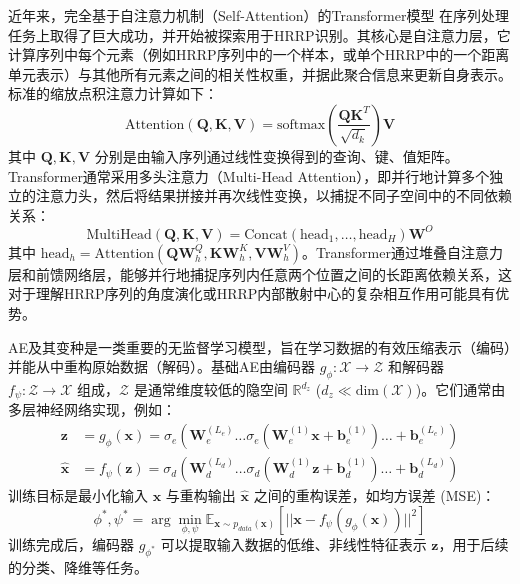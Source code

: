 近年来，完全基于自注意力机制（Self-Attention）的Transformer模型 在序列处理任务上取得了巨大成功，并开始被探索用于HRRP识别。其核心是自注意力层，它计算序列中每个元素（例如HRRP序列中的一个样本，或单个HRRP中的一个距离单元表示）与其他所有元素之间的相关性权重，并据此聚合信息来更新自身表示。标准的缩放点积注意力计算如下：
\begin{equation}
    \text{Attention}(\mathbf{Q}, \mathbf{K}, \mathbf{V}) = \text{softmax}\left(\frac{\mathbf{Q}\mathbf{K}^T}{\sqrt{d_k}}\right)\mathbf{V}
    \label{eq:scaled_dot_product_attention}
\end{equation}
其中 $\mathbf{Q}, \mathbf{K}, \mathbf{V}$ 分别是由输入序列通过线性变换得到的查询、键、值矩阵。Transformer通常采用多头注意力（Multi-Head Attention），即并行地计算多个独立的注意力头，然后将结果拼接并再次线性变换，以捕捉不同子空间中的不同依赖关系：
\begin{equation}
    \text{MultiHead}(\mathbf{Q}, \mathbf{K}, \mathbf{V}) = \text{Concat}(\text{head}_1, \dots, \text{head}_H) \mathbf{W}^O
    \label{eq:multi_head_attention}
\end{equation}
其中 $\text{head}_h = \text{Attention}(\mathbf{Q}\mathbf{W}_h^Q, \mathbf{K}\mathbf{W}_h^K, \mathbf{V}\mathbf{W}_h^V)$。Transformer通过堆叠自注意力层和前馈网络层，能够并行地捕捉序列内任意两个位置之间的长距离依赖关系，这对于理解HRRP序列的角度演化或HRRP内部散射中心的复杂相互作用可能具有优势。

AE及其变种是一类重要的无监督学习模型，旨在学习数据的有效压缩表示（编码）并能从中重构原始数据（解码）。基础AE由编码器 $g_\phi: \mathcal{X} \rightarrow \mathcal{Z}$ 和解码器 $f_\psi: \mathcal{Z} \rightarrow \mathcal{X}$ 组成，$\mathcal{Z}$ 是通常维度较低的隐空间 $\mathbb{R}^{d_z}$ ($d_z \ll \text{dim}(\mathcal{X})$)。它们通常由多层神经网络实现，例如：
\begin{align}
    \mathbf{z} &= g_\phi(\mathbf{x}) = \sigma_e(\mathbf{W}_e^{(L_e)} \dots \sigma_e(\mathbf{W}_e^{(1)} \mathbf{x} + \mathbf{b}_e^{(1)}) \dots + \mathbf{b}_e^{(L_e)}) \label{eq:ae_encoder_mlp} \\
    \hat{\mathbf{x}} &= f_\psi(\mathbf{z}) = \sigma_d(\mathbf{W}_d^{(L_d)} \dots \sigma_d(\mathbf{W}_d^{(1)} \mathbf{z} + \mathbf{b}_d^{(1)}) \dots + \mathbf{b}_d^{(L_d)}) \label{eq:ae_decoder_mlp}
\end{align}
训练目标是最小化输入 $\mathbf{x}$ 与重构输出 $\hat{\mathbf{x}}$ 之间的重构误差，如均方误差 (MSE)：
\begin{equation}
    \phi^*, \psi^* = \arg\min_{\phi, \psi} \mathbb{E}_{\mathbf{x} \sim p_{data}(\mathbf{x})} [ ||\mathbf{x} - f_\psi(g_\phi(\mathbf{x}))||^2 ]
    \label{eq:ae_objective_mse}
\end{equation}
训练完成后，编码器 $g_{\phi^*}$ 可以提取输入数据的低维、非线性特征表示 $\mathbf{z}$，用于后续的分类、降维等任务。

